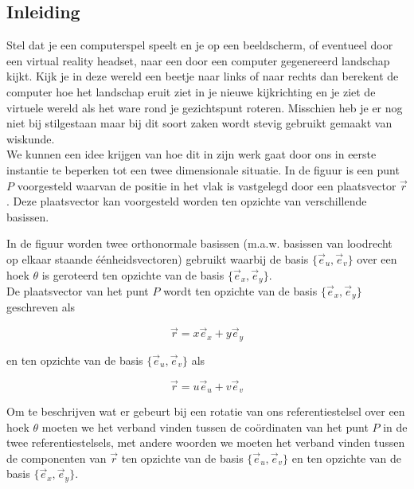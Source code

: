 \subsection*{Inleiding}

Stel dat je een computerspel speelt en je op een beeldscherm, of eventueel door een virtual reality headset, naar een door een computer gegenereerd landschap kijkt. Kijk je in deze wereld een beetje naar links of naar rechts dan berekent de computer hoe het landschap eruit ziet in je nieuwe kijkrichting en je ziet de virtuele wereld als het ware rond je gezichtspunt roteren. Misschien heb je er nog niet bij stilgestaan maar bij dit soort zaken wordt stevig gebruikt gemaakt van wiskunde.\\
We kunnen een idee krijgen van hoe dit in zijn werk gaat door ons in eerste instantie te beperken tot een twee dimensionale situatie. In de figuur is een punt $P$ voorgesteld waarvan de positie in het vlak is vastgelegd door een plaatsvector $\vec{r}$. Deze plaatsvector kan voorgesteld worden ten opzichte van verschillende basissen. 


\begin{center}

\end{center}

In de figuur worden twee orthonormale basissen (m.a.w. basissen van loodrecht op elkaar staande \'{e}\'{e}nheidsvectoren) gebruikt waarbij de basis $\{\vec{e}_u ,\vec{e}_v \}$ over een hoek $\theta$ is geroteerd ten opzichte van de basis $\{\vec{e}_x ,\vec{e}_y \}$. \\  De plaatsvector van het punt $P$ wordt ten opzichte van de basis $\{\vec{e}_x ,\vec{e}_y \}$ geschreven als

\[  \vec{r}=x \vec{e}_x + y \vec{e}_y \] 

en ten opzichte van de basis $\{\vec{e}_u ,\vec{e}_v \}$ als 

\[  \vec{r}=u \vec{e}_u + v \vec{e}_v \] 

Om te beschrijven wat er gebeurt bij een rotatie van ons referentiestelsel over een hoek $\theta$ moeten we het verband vinden tussen de co\"{o}rdinaten van het punt $P$ in de twee referentiestelsels, met andere woorden we moeten het verband vinden tussen de componenten van $\vec{r}$ ten opzichte van de basis $\{\vec{e}_u ,\vec{e}_v \}$ en ten opzichte van de basis $\{\vec{e}_x ,\vec{e}_y \}$.\\ 


